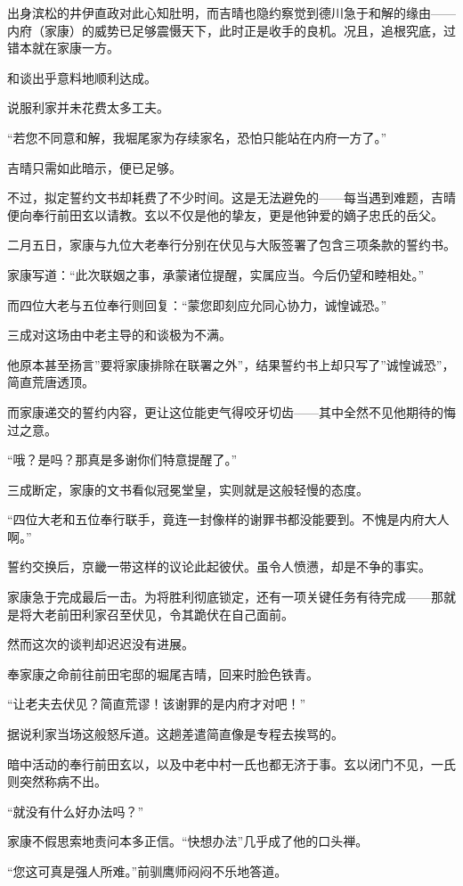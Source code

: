 \documentclass[
]{book}
\begin{document}
出身滨松的井伊直政对此心知肚明，而吉晴也隐约察觉到德川急于和解的缘由------内府（家康）的威势已足够震慑天下，此时正是收手的良机。况且，追根究底，过错本就在家康一方。

和谈出乎意料地顺利达成。

说服利家并未花费太多工夫。

``若您不同意和解，我堀尾家为存续家名，恐怕只能站在内府一方了。''

吉晴只需如此暗示，便已足够。

不过，拟定誓约文书却耗费了不少时间。这是无法避免的------每当遇到难题，吉晴便向奉行前田玄以请教。玄以不仅是他的挚友，更是他钟爱的嫡子忠氏的岳父。

二月五日，家康与九位大老奉行分别在伏见与大阪签署了包含三项条款的誓约书。

家康写道：``此次联姻之事，承蒙诸位提醒，实属应当。今后仍望和睦相处。''

而四位大老与五位奉行则回复：``蒙您即刻应允同心协力，诚惶诚恐。''

三成对这场由中老主导的和谈极为不满。

他原本甚至扬言''要将家康排除在联署之外''，结果誓约书上却只写了''诚惶诚恐''，简直荒唐透顶。

而家康递交的誓约内容，更让这位能吏气得咬牙切齿------其中全然不见他期待的悔过之意。

``哦？是吗？那真是多谢你们特意提醒了。''

三成断定，家康的文书看似冠冕堂皇，实则就是这般轻慢的态度。

``四位大老和五位奉行联手，竟连一封像样的谢罪书都没能要到。不愧是内府大人啊。''

誓约交换后，京畿一带这样的议论此起彼伏。虽令人愤懑，却是不争的事实。

家康急于完成最后一击。为将胜利彻底锁定，还有一项关键任务有待完成------那就是将大老前田利家召至伏见，令其跪伏在自己面前。

然而这次的谈判却迟迟没有进展。

奉家康之命前往前田宅邸的堀尾吉晴，回来时脸色铁青。

``让老夫去伏见？简直荒谬！该谢罪的是内府才对吧！''

据说利家当场这般怒斥道。这趟差遣简直像是专程去挨骂的。

暗中活动的奉行前田玄以，以及中老中村一氏也都无济于事。玄以闭门不见，一氏则突然称病不出。

``就没有什么好办法吗？''

家康不假思索地责问本多正信。``快想办法''几乎成了他的口头禅。

``您这可真是强人所难。''前驯鹰师闷闷不乐地答道。
\end{document}
